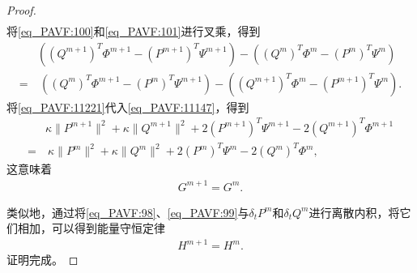 \begin{proof}
\begin{align}
\end{align}
将\eqref{eq_PAVF:100}和\eqref{eq_PAVF:101}进行叉乘，得到
\begin{align}\label{eq_PAVF:11221}
&((Q^{m+1})^{T}\varPhi^{m+1}-(P^{m+1})^{T}\Psi^{m+1})-((Q^{m})^{T}\varPhi^{m}-(P^{m})^{T}\Psi^{m})\nonumber\\
=&~((Q^{m})^{T}\varPhi^{m+1}-(P^{m})^{T}\Psi^{m+1})-((Q^{m+1})^{T}\varPhi^{m}-(P^{m+1})^{T}\Psi^{m}).
\end{align}
将\eqref{eq_PAVF:11221}代入\eqref{eq_PAVF:11147}，得到
\begin{align}
&\kappa \|P^{m+1}\|^2+\kappa \|Q^{m+1}\|^2+2(P^{m+1})^{T}\Psi^{m+1}-2(Q^{m+1})^{T}\varPhi^{m+1}\nonumber
\\=&~\kappa \|P^{m}\|^2+\kappa \|Q^{m}\|^2+2(P^{m})^{T}\Psi^{m}-2(Q^{m})^{T}\varPhi^{m},\label{eq_PAVF:11155}
\end{align}
这意味着
\begin{align}\label{eq_PAVF:11149}
G^{m+1}=G^{m} .
\end{align}

类似地，通过将\eqref{eq_PAVF:98}、\eqref{eq_PAVF:99}与$\delta_t P^{m}$和$\delta_t Q^{m}$进行离散内积，将它们相加，可以得到能量守恒定律
\begin{align}\label{eq_PAVF:11156}
H^{m+1}=H^{m}.
\end{align}
证明完成。
\end{proof}


